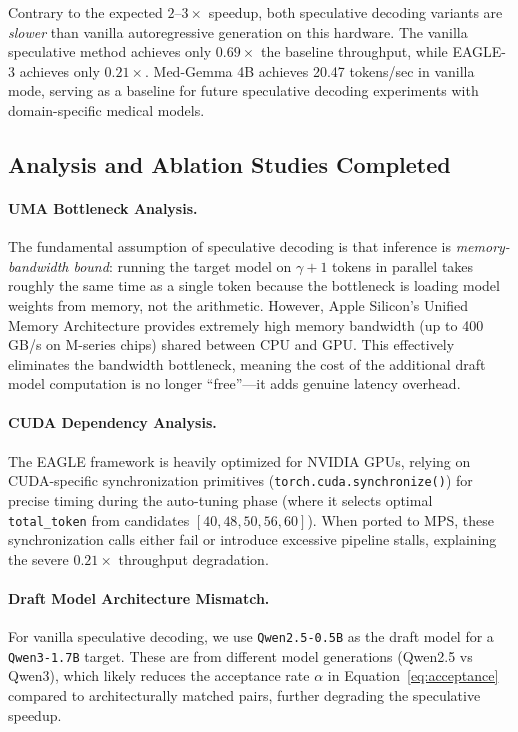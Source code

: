 \documentclass[11pt]{article}
\begin{document}
Contrary to the expected $2$--$3\times$ speedup, both speculative decoding variants are \textit{slower} than vanilla autoregressive generation on this hardware. The vanilla speculative method achieves only $0.69\times$ the baseline throughput, while EAGLE-3 achieves only $0.21\times$. Med-Gemma 4B achieves 20.47 tokens/sec in vanilla mode, serving as a baseline for future speculative decoding experiments with domain-specific medical models.

\subsection{Analysis and Ablation Studies Completed}

\paragraph{UMA Bottleneck Analysis.}
The fundamental assumption of speculative decoding is that inference is \emph{memory-bandwidth bound}: running the target model on $\gamma+1$ tokens in parallel takes roughly the same time as a single token because the bottleneck is loading model weights from memory, not the arithmetic. However, Apple Silicon's Unified Memory Architecture provides extremely high memory bandwidth (up to 400 GB/s on M-series chips) shared between CPU and GPU. This effectively eliminates the bandwidth bottleneck, meaning the cost of the additional draft model computation is no longer ``free''---it adds genuine latency overhead.

\paragraph{CUDA Dependency Analysis.}
The EAGLE framework is heavily optimized for NVIDIA GPUs, relying on CUDA-specific synchronization primitives (\texttt{torch.cuda.synchronize()}) for precise timing during the auto-tuning phase (where it selects optimal \texttt{total\_token} from candidates $[40, 48, 50, 56, 60]$). When ported to MPS, these synchronization calls either fail or introduce excessive pipeline stalls, explaining the severe $0.21\times$ throughput degradation.

\paragraph{Draft Model Architecture Mismatch.}
For vanilla speculative decoding, we use \texttt{Qwen2.5-0.5B} as the draft model for a \texttt{Qwen3-1.7B} target. These are from different model generations (Qwen2.5 vs Qwen3), which likely reduces the acceptance rate $\alpha$ in Equation~\ref{eq:acceptance} compared to architecturally matched pairs, further degrading the speculative speedup.
\end{document}

